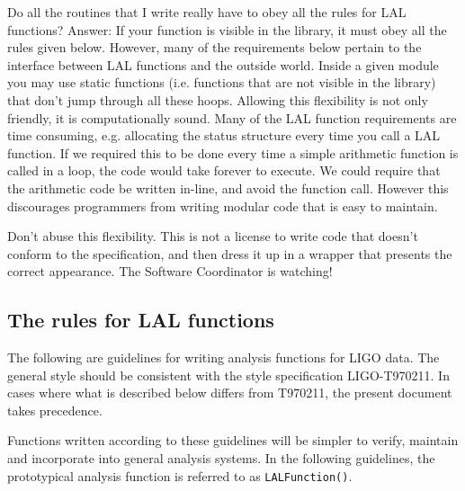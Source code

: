 \documentclass[]{ligodcc}
\begin{document}
Do all the routines that I write really have to obey all the  rules
for LAL functions? Answer: If your function is visible in the library,
it must obey all the rules given below.  However, many of the
requirements below pertain to the interface between LAL functions and
the outside world. Inside a given module you may use static functions
(i.e. functions that are not visible in the library) that don't jump
through all these hoops.  Allowing this flexibility is not only
friendly, it is computationally sound. Many of the LAL function
requirements are time consuming, e.g. allocating the status
structure every time you call a LAL function. If we required this to
be done every time a simple arithmetic function is called in a loop,
the code would take forever to execute. We could require that the
arithmetic code be written in-line, and avoid the function call.
However this discourages programmers from writing  modular code that
is easy to maintain.

Don't abuse this flexibility. This is not a license to write code that
doesn't conform to the specification, and then dress it up in a
wrapper that presents the correct appearance. The Software Coordinator
is watching!

\subsection{The rules for LAL functions}
The following are guidelines for writing analysis functions for LIGO
data. The general style should be consistent with the style
specification LIGO-T970211.  In cases where what is described below
differs from T970211, the present document takes precedence.

Functions written according to these guidelines will be simpler to
verify,  maintain and  incorporate into general analysis systems. In
the following guidelines, the prototypical analysis function is
referred to as {\tt LALFunction()}.
\end{document}
